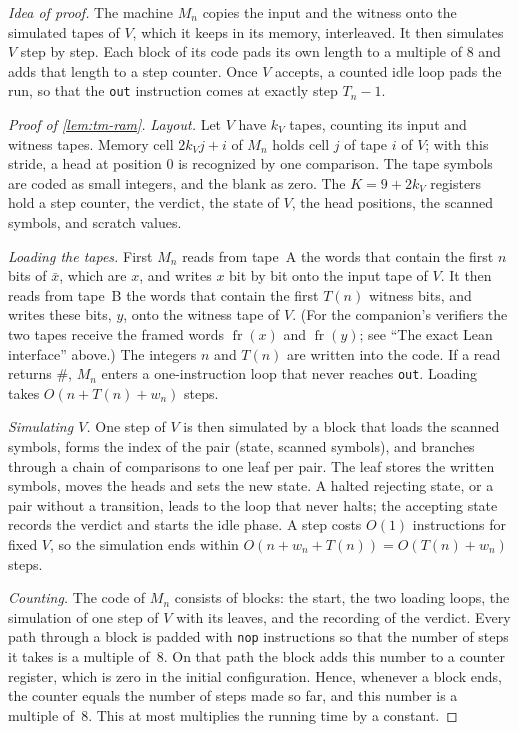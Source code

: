 \documentclass[11pt,letterpaper]{article}
\theoremstyle{definition}
\theoremstyle{remark}
\begin{document}
\emph{Idea of proof.} The machine \(M_n\) copies the input and the
witness onto the simulated tapes of \(V\), which it keeps in its memory,
interleaved. It then simulates \(V\) step by step. Each block of its
code pads its own length to a multiple of \(8\) and adds that length to
a step counter. Once \(V\) accepts, a counted idle loop pads the run, so
that the \texttt{out} instruction comes at exactly step \(T_n-1\).

\begin{proof}[Proof of \cref{lem:tm-ram}]
\emph{Layout.} Let \(V\) have \(k_V\) tapes, counting its input and
witness tapes. Memory cell \(2k_Vj+i\) of \(M_n\) holds cell \(j\) of
tape \(i\) of \(V\); with this stride, a head at position \(0\) is
recognized by one comparison. The tape symbols are coded as small
integers, and the blank as zero. The \(K=9+2k_V\) registers hold a step
counter, the verdict, the state of \(V\), the head positions, the
scanned symbols, and scratch values.

\emph{Loading the tapes.} First \(M_n\) reads from tape~A the words
that contain the first \(n\) bits of \(\bar x\), which are \(x\), and
writes \(x\) bit by bit onto the input tape of \(V\). It then reads from
tape~B the words that contain the first \(T(n)\) witness bits, and writes
these bits, \(y\), onto the witness tape of \(V\). (For the companion's
verifiers the two tapes receive the framed words
\(\operatorname{fr}(x)\) and \(\operatorname{fr}(y)\); see ``The exact
Lean interface'' above.) The integers \(n\) and \(T(n)\) are written
into the code. If a read returns \(\#\), \(M_n\) enters a one-instruction
loop that never reaches \texttt{out}. Loading takes
\(O(n+T(n)+w_n)\) steps.

\emph{Simulating \(V\).} One step of \(V\) is then simulated by a block
that loads the scanned symbols, forms the index of the pair (state,
scanned symbols), and branches through a chain of comparisons to one
leaf per pair. The leaf stores the written symbols, moves the heads and
sets the new state. A halted rejecting state, or a pair without a
transition, leads to the loop that never halts; the accepting state
records the verdict and starts the idle phase. A step costs \(O(1)\)
instructions for fixed \(V\), so the simulation ends within
\(O(n+w_n+T(n))=O(T(n)+w_n)\) steps.

\emph{Counting.} The code of \(M_n\) consists of blocks: the start, the
two loading loops, the simulation of one step of \(V\) with its leaves,
and the recording of the verdict. Every path through a block is padded
with \texttt{nop} instructions so that the number of steps it takes is
a multiple of~\(8\). On that path the block adds this number to a
counter register, which is zero in the initial configuration. Hence,
whenever a block ends, the counter equals the number of steps made so
far, and this number is a multiple of~\(8\). This at most multiplies
the running time by a constant.


\end{proof}
\end{document}
